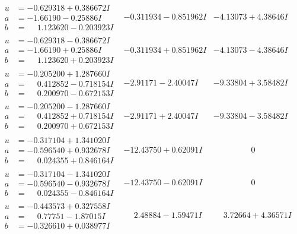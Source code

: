 \documentclass[1p]{elsarticle_modified}
\theoremstyle{definition}
\begin{document}
$$\begin{array}{c|c|c}
\begin{aligned}
u &= -0.629318 + 0.386672 I \\
a &= -1.66190 - 0.25886 I \\
b &= \phantom{-}1.123620 - 0.203923 I\end{aligned}
 & -0.311934 - 0.851962 I & -4.13073 + 4.38646 I \\ \hline\begin{aligned}
u &= -0.629318 - 0.386672 I \\
a &= -1.66190 + 0.25886 I \\
b &= \phantom{-}1.123620 + 0.203923 I\end{aligned}
 & -0.311934 + 0.851962 I & -4.13073 - 4.38646 I \\ \hline\begin{aligned}
u &= -0.205200 + 1.287660 I \\
a &= \phantom{-}0.412852 - 0.718154 I \\
b &= \phantom{-}0.200970 - 0.672153 I\end{aligned}
 & -2.91171 - 2.40047 I & -9.33804 + 3.58482 I \\ \hline\begin{aligned}
u &= -0.205200 - 1.287660 I \\
a &= \phantom{-}0.412852 + 0.718154 I \\
b &= \phantom{-}0.200970 + 0.672153 I\end{aligned}
 & -2.91171 + 2.40047 I & -9.33804 - 3.58482 I \\ \hline\begin{aligned}
u &= -0.317104 + 1.341020 I \\
a &= -0.596540 + 0.932678 I \\
b &= \phantom{-}0.024355 + 0.846164 I\end{aligned}
 & -12.43750 + 0.62091 I & \phantom{-0.000000 } 0 \\ \hline\begin{aligned}
u &= -0.317104 - 1.341020 I \\
a &= -0.596540 - 0.932678 I \\
b &= \phantom{-}0.024355 - 0.846164 I\end{aligned}
 & -12.43750 - 0.62091 I & \phantom{-0.000000 } 0 \\ \hline\begin{aligned}
u &= -0.443573 + 0.327558 I \\
a &= \phantom{-}0.77751 - 1.87015 I \\
b &= -0.326610 + 0.038977 I\end{aligned}
 & \phantom{-}2.48884 - 1.59471 I & \phantom{-}3.72664 + 4.36571 I \\ \hline\begin{aligned}

\end{aligned}
\end{array}$$
\end{document}
